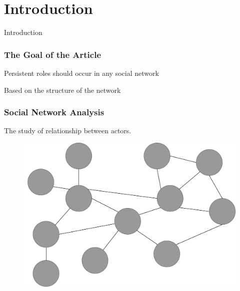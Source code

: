 \section{Introduction}

\begin{frame}
     \begin{center}
     	\huge Introduction
     \end{center}
\end{frame}

\begin{frame}
\frametitle{The Goal of the Article}
Persistent roles should occur in any social network

Based on the structure of the network

\end{frame}

\begin{frame}
\frametitle{Social Network Analysis}
The study of relationship between actors.

\begin{figure}
\includegraphics[scale=0.25]{graphics/social_network.pdf}
\end{figure}

\end{frame}




